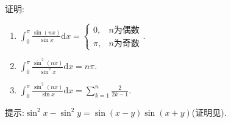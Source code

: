 \documentclass[../../main.tex]{subfiles}
\begin{document}
\begin{proposition}\label{example:经典定积分(必记)}
证明:
\begin{enumerate}[(1)]
\item $\int_0^{\pi}{\frac{\sin \left( nx \right)}{\sin x}\mathrm{d}x}= 
\begin{cases}
0, & n\text{为偶数} \\
\pi, & n\text{为奇数}
\end{cases}.$

\item $\int_0^{\pi}{\frac{\sin ^2\left( nx \right)}{\sin ^2x}}\mathrm{d}x=n\pi$.

\item $\int_0^{\pi}{\frac{\sin ^2\left( nx \right)}{\sin x}}\mathrm{d}x=\sum_{k=1}^n{\frac{2}{2k-1}}$.
\end{enumerate}
\end{proposition}
\begin{note}
提示:$\sin ^2x-\sin ^2y=\sin \left( x-y \right) \sin \left( x+y \right)$(证明见).
\end{note}
\end{document}
